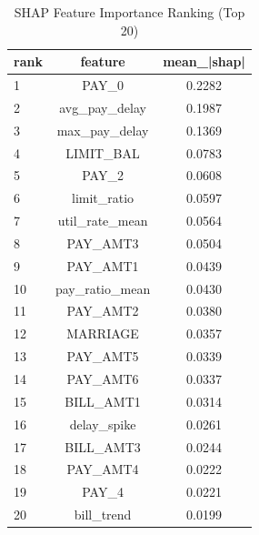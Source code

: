 \begin{table}
\centering
\caption{SHAP Feature Importance Ranking (Top 20)}
\label{tab:shap_ranking}
\begin{tabular}{lcc}
\toprule
rank & feature & mean_|shap| \\
\midrule
1 & PAY_0 & 0.2282 \\
2 & avg_pay_delay & 0.1987 \\
3 & max_pay_delay & 0.1369 \\
4 & LIMIT_BAL & 0.0783 \\
5 & PAY_2 & 0.0608 \\
6 & limit_ratio & 0.0597 \\
7 & util_rate_mean & 0.0564 \\
8 & PAY_AMT3 & 0.0504 \\
9 & PAY_AMT1 & 0.0439 \\
10 & pay_ratio_mean & 0.0430 \\
11 & PAY_AMT2 & 0.0380 \\
12 & MARRIAGE & 0.0357 \\
13 & PAY_AMT5 & 0.0339 \\
14 & PAY_AMT6 & 0.0337 \\
15 & BILL_AMT1 & 0.0314 \\
16 & delay_spike & 0.0261 \\
17 & BILL_AMT3 & 0.0244 \\
18 & PAY_AMT4 & 0.0222 \\
19 & PAY_4 & 0.0221 \\
20 & bill_trend & 0.0199 \\
\bottomrule
\end{tabular}
\end{table}
